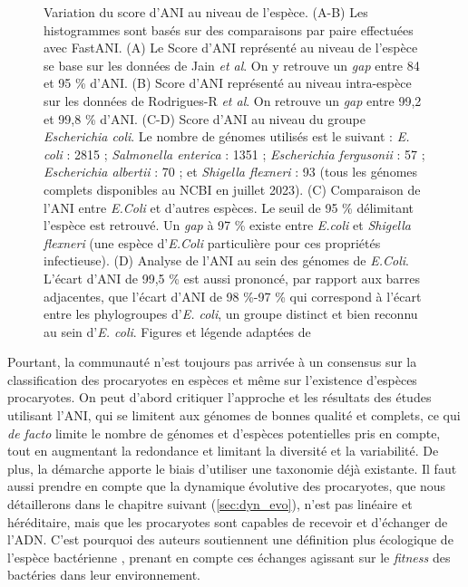 \begin{figure}[htbp]
{    }
    \caption[Variation du score d'ANI au niveau de l'espèce]{Variation du score d'ANI au niveau de l'espèce. (A-B) Les histogrammes sont basés sur des comparaisons par paire effectuées avec FastANI. (A) Le Score d'ANI représenté au niveau de l'espèce se base sur les données de Jain \textit{et al}. On y retrouve un \textit{gap} entre 84 et 95 \% d'ANI. (B) Score d'ANI représenté au niveau intra-espèce sur les données de Rodrigues-R \textit{et al}. On retrouve un \textit{gap} entre 99,2 et 99,8 \% d'ANI. (C-D) Score d'ANI au niveau du groupe \textit{Escherichia coli}. Le nombre de génomes utilisés est le suivant : \textit{E. coli} : 2815 ; \textit{Salmonella enterica} : 1351 ; \textit{Escherichia fergusonii} : 57 ; \textit{Escherichia albertii} : 70 ; et \textit{Shigella flexneri} : 93 (tous les génomes complets disponibles au NCBI en juillet 2023). (C) Comparaison de l'ANI entre \textit{E.Coli} et d'autres espèces. Le seuil de 95 \% délimitant l'espèce est retrouvé. Un \textit{gap} à 97 \% existe entre \textit{E.coli} et \textit{Shigella flexneri} (une espèce d'\textit{E.Coli} particulière pour ces propriétés infectieuse). (D) Analyse de l'ANI au sein des génomes de \textit{E.Coli}. L'écart d'ANI de 99,5 \% est aussi prononcé, par rapport aux barres adjacentes, que l'écart d'ANI de 98 \%-97 \% qui correspond à l'écart entre les phylogroupes d'\textit{E. coli}, un groupe distinct et bien reconnu au sein d'\textit{E. coli}. Figures et légende adaptées de \cite{konstantinidis_sequence-discrete_2023}}
    \label{fig:ANI_gap_sp}
\end{figure}


Pourtant, la communauté n'est toujours pas arrivée à un consensus sur la classification des procaryotes en espèces et même sur l'existence d'espèces procaryotes. On peut d'abord critiquer l'approche et les résultats des études utilisant l'ANI, qui se limitent aux génomes de bonnes qualité et complets, ce qui \textit{de facto} limite le nombre de génomes et d'espèces potentielles pris en compte, tout en augmentant la redondance et limitant la diversité et la variabilité. De plus, la démarche apporte le biais d'utiliser une taxonomie déjà existante. Il faut aussi prendre en compte que la dynamique évolutive des procaryotes, que nous détaillerons dans le chapitre suivant (\autoref{sec:dyn_evo}), n'est pas linéaire et héréditaire, mais que les procaryotes sont capables de recevoir et d'échanger de l'ADN. C'est pourquoi des auteurs soutiennent une définition plus écologique de l'espèce bactérienne \cite{luo_genome_2011}, prenant en compte ces échanges agissant sur le \textit{fitness} des bactéries dans leur environnement.


